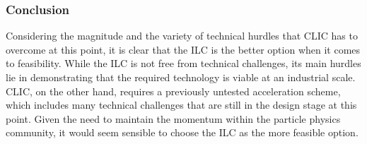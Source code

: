 \subsubsection{Conclusion}
Considering the magnitude and the variety of technical hurdles that CLIC has to overcome at this 
point, it is clear that the ILC is the better option when it comes to feasibility. While 
the ILC is not free from technical challenges, its main hurdles lie in demonstrating that the required 
technology is viable at an industrial scale. CLIC, on the other hand, requires a previously untested 
acceleration scheme, which includes many technical challenges that are still in the design stage at 
this point. Given the need to maintain the momentum within the particle physics community, it 
would seem sensible to choose the ILC as the more feasible option. 